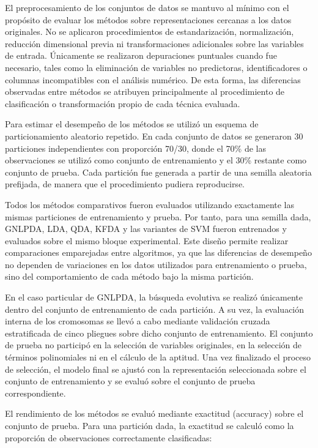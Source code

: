 El preprocesamiento de los conjuntos de datos se mantuvo al mínimo con el propósito de evaluar los métodos sobre representaciones cercanas a los datos originales. No se aplicaron procedimientos de estandarización, normalización, reducción dimensional previa ni transformaciones adicionales sobre las variables de entrada. Únicamente se realizaron depuraciones puntuales cuando fue necesario, tales como la eliminación de variables no predictoras, identificadores o columnas incompatibles con el análisis numérico. De esta forma, las diferencias observadas entre métodos se atribuyen principalmente al procedimiento de clasificación o transformación propio de cada técnica evaluada.

Para estimar el desempeño de los métodos se utilizó un esquema de particionamiento aleatorio repetido. En cada conjunto de datos se generaron 30 particiones independientes con proporción 70/30, donde el 70\% de las observaciones se utilizó como conjunto de entrenamiento y el 30\% restante como conjunto de prueba. Cada partición fue generada a partir de una semilla aleatoria prefijada, de manera que el procedimiento pudiera reproducirse.

Todos los métodos comparativos fueron evaluados utilizando exactamente las mismas particiones de entrenamiento y prueba. Por tanto, para una semilla dada, GNLPDA, LDA, QDA, KFDA y las variantes de SVM fueron entrenados y evaluados sobre el mismo bloque experimental. Este diseño permite realizar comparaciones emparejadas entre algoritmos, ya que las diferencias de desempeño no dependen de variaciones en los datos utilizados para entrenamiento o prueba, sino del comportamiento de cada método bajo la misma partición.

En el caso particular de GNLPDA, la búsqueda evolutiva se realizó únicamente dentro del conjunto de entrenamiento de cada partición. A su vez, la evaluación interna de los cromosomas se llevó a cabo mediante validación cruzada estratificada de cinco pliegues sobre dicho conjunto de entrenamiento. El conjunto de prueba no participó en la selección de variables originales, en la selección de términos polinomiales ni en el cálculo de la aptitud. Una vez finalizado el proceso de selección, el modelo final se ajustó con la representación seleccionada sobre el conjunto de entrenamiento y se evaluó sobre el conjunto de prueba correspondiente.

El rendimiento de los métodos se evaluó mediante exactitud (accuracy) sobre el conjunto de prueba. Para una partición dada, la exactitud se calculó como la proporción de observaciones correctamente clasificadas:

